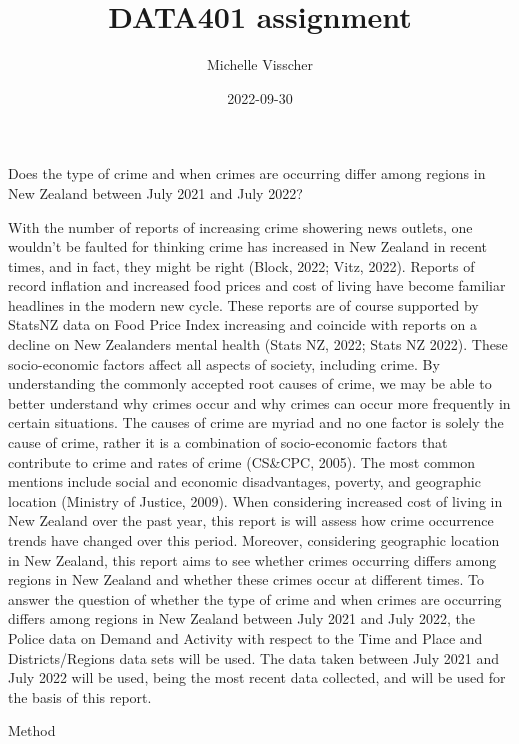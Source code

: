 \documentclass[
  10pt,
]{article}
\title{DATA401 assignment}
\author{Michelle Visscher}
\date{2022-09-30}
\begin{document}
\maketitle

Does the type of crime and when crimes are occurring differ among
regions in New Zealand between July 2021 and July 2022?

With the number of reports of increasing crime showering news outlets,
one wouldn't be faulted for thinking crime has increased in New Zealand
in recent times, and in fact, they might be right (Block, 2022; Vitz,
2022). Reports of record inflation and increased food prices and cost of
living have become familiar headlines in the modern new cycle. These
reports are of course supported by StatsNZ data on Food Price Index
increasing and coincide with reports on a decline on New Zealanders
mental health (Stats NZ, 2022; Stats NZ 2022). These socio-economic
factors affect all aspects of society, including crime. By understanding
the commonly accepted root causes of crime, we may be able to better
understand why crimes occur and why crimes can occur more frequently in
certain situations. The causes of crime are myriad and no one factor is
solely the cause of crime, rather it is a combination of socio-economic
factors that contribute to crime and rates of crime (CS\&CPC, 2005). The
most common mentions include social and economic disadvantages, poverty,
and geographic location (Ministry of Justice, 2009). When considering
increased cost of living in New Zealand over the past year, this report
is will assess how crime occurrence trends have changed over this
period. Moreover, considering geographic location in New Zealand, this
report aims to see whether crimes occurring differs among regions in New
Zealand and whether these crimes occur at different times. To answer the
question of whether the type of crime and when crimes are occurring
differs among regions in New Zealand between July 2021 and July 2022,
the Police data on Demand and Activity with respect to the Time and
Place and Districts/Regions data sets will be used. The data taken
between July 2021 and July 2022 will be used, being the most recent data
collected, and will be used for the basis of this report.

Method
\end{document}
